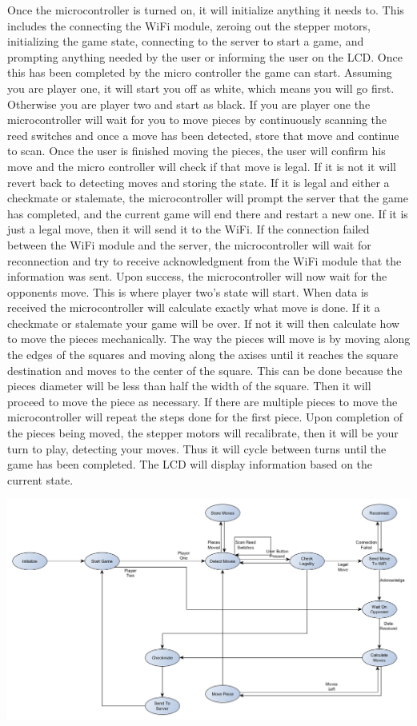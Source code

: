\documentclass[12pt]{article}
\begin{document}
Once the microcontroller is turned on, it will initialize anything it needs to. This includes the connecting the WiFi module, zeroing out the stepper motors, initializing the game state, connecting to the server to start a game, and prompting anything needed by the user or informing the user on the LCD. Once this has been completed by the micro controller the game can start. Assuming you are player one, it will start you off as white, which means you will go first. Otherwise you are player two and start as black. If you are player one the microcontroller will wait for you to move pieces by continuously scanning the reed switches and once a move has been detected, store that move and continue to scan. Once the user is finished moving the pieces, the user will confirm his move and the micro controller will check if that move is legal. If it is not it will revert back to detecting moves and storing the state. If it is legal and either a checkmate or stalemate, the microcontroller will prompt the server that the game has completed, and the current game will end there and restart a new one. If it is just a legal move, then it will send it to the WiFi. If the connection failed between the WiFi module and the server, the microcontroller will wait for reconnection and try to receive acknowledgment from the WiFi module that the information was sent. Upon success, the microcontroller will now wait for the opponents move. This is where player two’s state will start. When data is received the microcontroller will calculate exactly what move is done. If it a checkmate or stalemate your game will be over. If not it will then calculate how to move the pieces mechanically. The way the pieces will move is by moving along the edges of the squares and moving along the axises until it reaches the square destination and moves to the center of the square. This can be done because the pieces diameter will be less than half the width of the square. Then it will proceed to move the piece as necessary. If there are multiple pieces to move the microcontroller will repeat the steps done for the first piece. Upon completion of the pieces being moved, the stepper motors will recalibrate, then it will be your turn to play, detecting your moves. Thus it will cycle between turns until the game has been completed. The LCD will display information based on the current state.

\vspace*{5mm}

\centerline{\includegraphics[scale=.4]{Microcontroller_State}}
\end{document}
